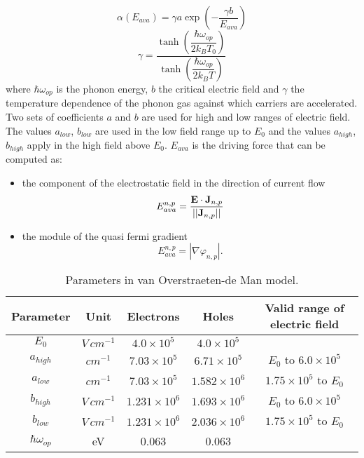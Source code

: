 \begin{equation}
\alpha(E_{ava}) = \gamma a \exp\left(-\dfrac{\gamma b}{E_{ava}} \right)
\end{equation} 
\begin{equation}
\gamma = \dfrac{\tanh\left(\dfrac{\hbar \omega_{op}}{2k_BT_0} \right) }{\tanh\left(\dfrac{\hbar \omega_{op}}{2k_BT} \right)}
\end{equation}
where $\hbar \omega_{op}$ is the phonon energy, $b$ the critical electric field and $\gamma$ the temperature dependence of the phonon gas against which carriers are accelerated. Two sets of coefficients $a$ and $b$ are used for high and low ranges of electric field. The values $a_{low}$, $b_{low}$ are used in the low field range up to $E_{0}$ and the values $a_{high}$, $b_{high}$ apply in the high field above $E_0$. $E_{ava}$ is the driving force that can be computed as:
\begin{itemize}
\item the component of the electrostatic field in the direction of current flow
\begin{equation}
E_{ava}^{n,p} = \dfrac{\mathbf{E}\cdot\mathbf{J}_{n,p}}{||\mathbf{J}_{n,p}||}
\end{equation}
\item the module of the quasi fermi gradient
\begin{equation}
E_{ava}^{n,p} = |\nabla \varphi_{n,p}|.
\end{equation}
\end{itemize}

\begin{table}[!h]
\centering
\begin{tabular}{ccccc}
\toprule
Parameter & Unit & Electrons & Holes  & Valid range of electric field\\
\midrule
$E_0$ & $V \, cm^{-1}$ & $4.0 \times 10^{5}$ & $4.0 \times 10^{5}$ & \\
$a_{high}$ & $cm^{-1}$ & $7.03 \times 10^{5}$ & $6.71 \times 10^{5}$ & $E_0$ to $6.0 \times 10^{5}$\\
$a_{low}$ & $cm^{-1}$ & $7.03 \times 10^{5}$ & $1.582 \times 10^{6}$ & $1.75 \times 10^{5}$ to $E_0$\\
$b_{high}$ & $V \, cm^{-1}$ & $1.231 \times 10^{6}$ & $1.693 \times 10^{6}$ & $E_0$ to $6.0 \times 10^{5}$\\
$b_{low}$ & $V \, cm^{-1}$ & $1.231 \times 10^{6}$ & $2.036 \times 10^{6}$ &$1.75 \times 10^{5}$ to $E_0$\\
$\hbar\omega_{op}$ & eV & 0.063 & 0.063\\
\bottomrule
\end{tabular}
\caption{Parameters in van Overstraeten-de Man model.}
\end{table}




